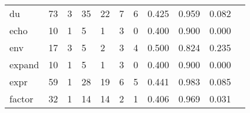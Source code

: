 \begin{longtable}{lp{1.2cm}p{1.2cm}p{1.2cm}p{1.2cm}p{1.2cm}p{1.2cm}p{1.2cm}p{1.2cm}p{1.2cm}p{1.2cm}}
du        &                                    73 &                                                  3 &                                                 35 &                                                 22 &                                                  7 &                                                  6 &                                              0.425 &                                              0.959 &                                              0.082 \\
echo      &                                    10 &                                                  1 &                                                  5 &                                                  1 &                                                  3 &                                                  0 &                                              0.400 &                                              0.900 &                                              0.000 \\
env       &                                    17 &                                                  3 &                                                  5 &                                                  2 &                                                  3 &                                                  4 &                                              0.500 &                                              0.824 &                                              0.235 \\
expand    &                                    10 &                                                  1 &                                                  5 &                                                  1 &                                                  3 &                                                  0 &                                              0.400 &                                              0.900 &                                              0.000 \\
expr      &                                    59 &                                                  1 &                                                 28 &                                                 19 &                                                  6 &                                                  5 &                                              0.441 &                                              0.983 &                                              0.085 \\
factor    &                                    32 &                                                  1 &                                                 14 &                                                 14 &                                                  2 &                                                  1 &                                              0.406 &                                              0.969 &                                              0.031 \\

\end{longtable}
